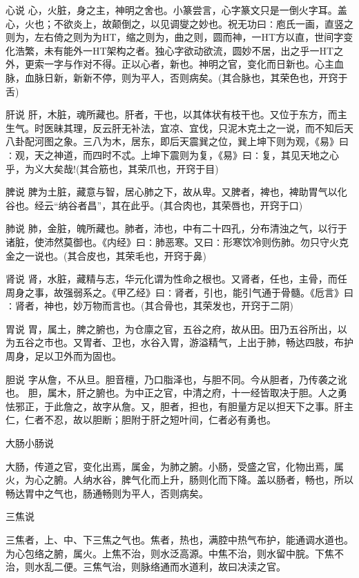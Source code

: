 \documentclass[a4paper,12pt,UTF8,twoside]{ctexbook}
\begin{document}
	心说
	心，火脏，身之主，神明之舍也。小篆尝言，心字篆文只是一倒火字耳。盖心，火也；不欲炎上，故颠倒之，以见调燮之妙也。祝无功曰∶庖氏一画，直竖之则为，左右倚之则为为HT，缩之则为，曲之则，圆而神，一HT方以直，世间字变化浩繁，未有能外一HT架构之者。独心字欲动欲流，圆妙不居，出之乎一HT之外，更索一字与作对不得。正以心者，新也。神明之官，变化而日新也。心主血脉，血脉日新，新新不停，则为平人，否则病矣。(其合脉也，其荣色也，开窍于舌)
	
	肝说
	肝，木脏，魂所藏也。肝者，干也，以其体状有枝干也。又位于东方，而主生气。时医昧其理，反云肝无补法，宜凉、宜伐，只泥木克土之一说，而不知后天八卦配河图之象。三八为木，居东，即后天震巽之位，巽上坤下则为观，《易》曰∶观，天之神道，而四时不忒。上坤下震则为复，《易》曰∶复，其见天地之心乎，为义大矣哉!(其合筋也，其荣爪也，开窍于目)
	
	脾说
	脾为土脏，藏意与智，居心肺之下，故从卑。又脾者，裨也，裨助胃气以化谷也。经云“纳谷者昌”，其在此乎。(其合肉也，其荣唇也，开窍于口)
	
	肺说
	肺，金脏，魄所藏也。肺者，沛也，中有二十四孔，分布清浊之气，以行于诸脏，使沛然莫御也。《内经》曰∶肺恶寒。又曰∶形寒饮冷则伤肺。勿只守火克金之一说也。(其合皮也，其荣毛也，开窍于鼻)
	
	肾说
	肾，水脏，藏精与志，华元化谓为性命之根也。又肾者，任也，主骨，而任周身之事，故强弱系之。《甲乙经》曰∶肾者，引也，能引气通于骨髓。《卮言》曰∶肾者，神也，妙万物而言也。(其合骨也，其荣发也，开窍于二阴)
	
	胃说
	胃，属土，脾之腑也，为仓廪之官，五谷之府，故从田。田乃五谷所出，以为五谷之市也。又胃者、卫也，水谷入胃，游溢精气，上出于肺，畅达四肢，布护周身，足以卫外而为固也。
	
	胆说
	字从詹，不从旦。胆音檀，乃口脂泽也，与胆不同。今从胆者，乃传袭之讹也。
	胆，属木，肝之腑也。为中正之官，中清之府，十一经皆取决于胆。人之勇怯邪正，于此詹之，故字从詹。又，胆者，担也，有胆量方足以担天下之事。肝主仁，仁者不忍，故以胆断；胆附于肝之短叶间，仁者必有勇也。
	
	大肠小肠说
  
	大肠，传道之官，变化出焉，属金，为肺之腑。小肠，受盛之官，化物出焉，属火，为心之腑。人纳水谷，脾气化而上升，肠则化而下降。盖以肠者，畅也，所以畅达胃中之气也，肠通畅则为平人，否则病矣。
	
	三焦说

	三焦者，上、中、下三焦之气也。焦者，热也，满腔中热气布护，能通调水道也。为心包络之腑，属火。上焦不治，则水泛高源。中焦不治，则水留中脘。下焦不治，则水乱二便。三焦气治，则脉络通而水道利，故曰决渎之官。
	
\end{document}
